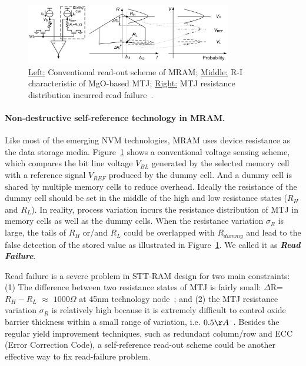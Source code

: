 \begin{figure}
\centering
\vspace{-10pt}
\includegraphics[width=0.8\textwidth]{./figure/5_selfref.pdf}
\vspace{-10pt}
\caption{\underline{Left:} Conventional read-out scheme of MRAM; \underline{Middle:} R-I characteristic of MgO-based MTJ; \underline{Right:} MTJ resistance distribution incurred read failure~\cite{Li09}.}
\label{selfref}
\vspace{-10pt}
\end{figure}

\paragraph{Non-destructive self-reference technology in MRAM.} Like most of the emerging NVM technologies, MRAM uses device resistance as the data storage media. Figure~\ref{selfref} shows a conventional voltage sensing scheme, which compares the bit line voltage $V_{BL}$ generated by the selected memory cell with a reference signal $V_{REF}$ produced by the dummy cell. And a dummy cell is shared by multiple memory cells to reduce overhead. Ideally the resistance of the dummy cell should be set in the middle of the high and low resistance states ($R_H$ and $R_L$). In reality, process variation incurs the resistance distribution of MTJ in memory cells as well as the dummy cells. When the resistance variation $\sigma_R$ is large, the tails of $R_H$ or/and $R_L$ could be overlapped with $R_{dummy}$ and lead to the false detection of the stored value as illustrated in Figure~\ref{selfref}. We called it as \textbf{\emph{Read Failure}}.

Read failure is a severe problem in STT-RAM design for two main constraints: (1) The difference between two resistance states of MTJ is fairly small: $\Delta$R=$R_H-R_L$ $\approx$ $1000\Omega$ at 45nm technology node~\cite{Li09}; and (2) the MTJ resistance variation $\sigma_R$ is relatively high because it is extremely difficult to control oxide barrier thickness within a small range of variation, i.e. $0.5{\AA}$~\cite{Jeong03}. Besides the regular yield improvement techniques, such as redundant column/row and ECC (Error Correction Code), a self-reference read-out scheme could be another effective way to fix read-failure problem.


